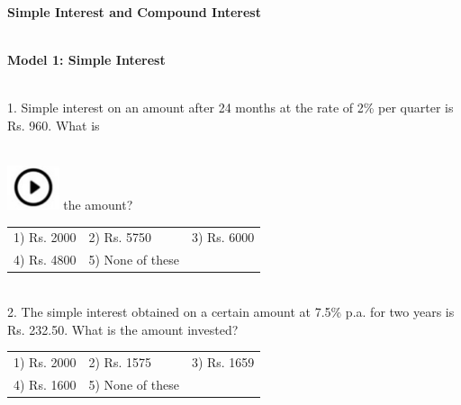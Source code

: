 \documentclass{article}
\begin{document}
	
	
	
	
	\noindent \begin{center}
		{\Large \textbf{Simple Interest and Compound Interest \\}}
	\end{center}
	
	\noindent 
	
	\noindent 
	
	
	\noindent 
	
	\noindent 
	
	\noindent \\ \textbf{Model 1: Simple Interest}
	
	\noindent 
	
	\noindent 
	
	\noindent \\  1.   Simple interest on an amount after 24 months at the rate of 2\% per quarter is Rs. 960. What is
	
	\noindent  
\noindent \\ \includegraphics*[width=0.60in, height=0.52in]{images/image1} the amount?
	
	\noindent \begin{tabular}{p{1.7in} p{1.6in} p{1.6in}} \\ 
 1)  Rs. 2000                &  2) Rs. 5750          &  3) Rs. 6000          \\
4) Rs. 4800          & 5) None of these  \\
\end{tabular}
	
	\noindent 
	
	\noindent 
	
	\noindent 
	
	\noindent \\  2.   The simple interest obtained on a certain amount at 7.5\% p.a. for two years is Rs. 232.50. What is the amount invested?
	
	\noindent \begin{tabular}{p{1.7in} p{1.6in} p{1.6in}} \\ 
 1) Rs. 2000                 &  2) Rs. 1575          &  3) Rs. 1659          \\
4) Rs. 1600          & 5) None of these  \\
\end{tabular}
	
\end{document}
